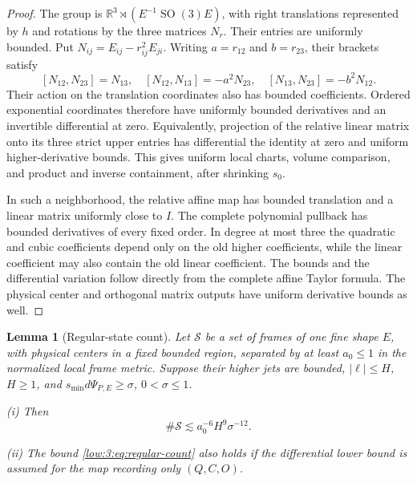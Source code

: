 \documentclass[11pt]{amsart}
\newtheorem{lemma}[theorem]{Lemma}
\theoremstyle{definition}
\theoremstyle{remark}
\newcommand{\R}{\mathbb R}
\newcommand{\abs}[1]{\lvert #1\rvert}
\numberwithin{equation}{section}
\begin{document}
\begin{proof}
The group is $\R^3\rtimes(E^{-1}\operatorname{SO}(3)E)$, with right translations represented by $h$ and rotations by the three matrices $N_r$. Their entries are uniformly bounded. Put $N_{ij}=E_{ij}-r_{ij}^2E_{ji}$. Writing $a=r_{12}$ and $b=r_{23}$, their brackets satisfy
\[
[N_{12},N_{23}]=N_{13},\quad [N_{12},N_{13}]=-a^2N_{23},\quad [N_{13},N_{23}]=-b^2N_{12}.
\]
Their action on the translation coordinates also has bounded coefficients. Ordered exponential coordinates therefore have uniformly bounded derivatives and an invertible differential at zero. Equivalently, projection of the relative linear matrix onto its three strict upper entries has differential the identity at zero and uniform higher-derivative bounds. This gives uniform local charts, volume comparison, and product and inverse containment, after shrinking $s_0$.

In such a neighborhood, the relative affine map has bounded translation and a linear matrix uniformly close to $I$. The complete polynomial pullback has bounded derivatives of every fixed order. In degree at most three the quadratic and cubic coefficients depend only on the old higher coefficients, while the linear coefficient may also contain the old linear coefficient. The bounds and the differential variation follow directly from the complete affine Taylor formula. The physical center and orthogonal matrix outputs have uniform derivative bounds as well.
\end{proof}

\begin{lemma}[Regular-state count]\label{low:3:lem:count}
Let $\mathcal S$ be a set of frames of one fine shape $E$, with physical centers in a fixed bounded region, separated by at least $a_0\leq1$ in the normalized local frame metric. Suppose their higher jets are bounded, $\abs\ell\leq H$, $H\geq1$, and $s_{\min} d\Psi_{P,E}\geq\sigma$, $0<\sigma\leq1$.

\noindent\textup{(i)} Then
\begin{equation}\label{low:3:eq:regular-count}
\#\mathcal S\lesssim a_0^{-6}H^9\sigma^{-12}.
\end{equation}

\noindent\textup{(ii)} The bound \eqref{low:3:eq:regular-count} also holds if the differential lower bound is assumed for the map recording only $(Q,C,O)$.
\end{lemma}
\end{document}

